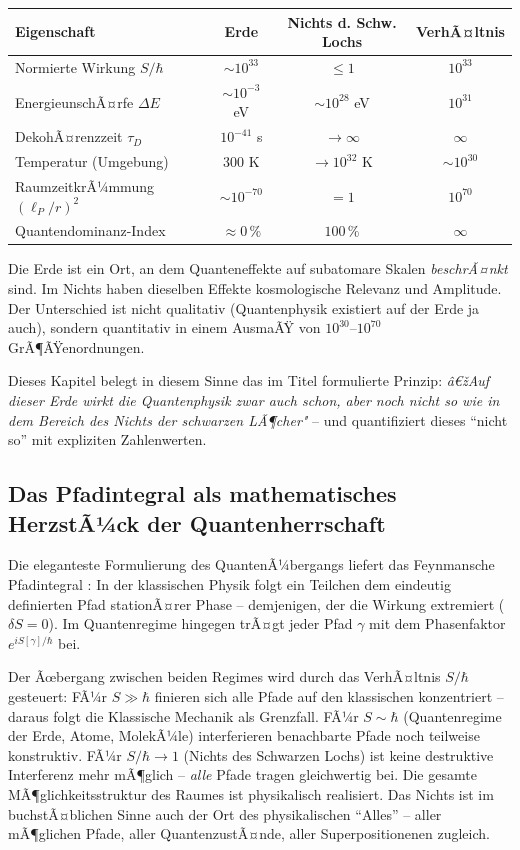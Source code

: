 ﻿\documentclass[12pt,a4paper]{report}
\begin{document}
\begin{center}
\renewcommand{\arraystretch}{1.35}
\begin{tabular}{lccc}
    \hline
    \textbf{Eigenschaft} & \textbf{Erde} & \textbf{Nichts d. Schw. Lochs} & \textbf{VerhÃ¤ltnis} \\
    \hline
    Normierte Wirkung $S/\hbar$ & $\sim 10^{33}$ & $\leq 1$ & $10^{33}$ \\
    EnergieunschÃ¤rfe $\Delta E$ & $\sim 10^{-3}$ eV & $\sim 10^{28}$ eV & $10^{31}$ \\
    DekohÃ¤renzzeit $\tau_D$ & $10^{-41}$ s & $\to \infty$ & $\infty$ \\
    Temperatur (Umgebung) & 300 K & $\to 10^{32}$ K & $\sim 10^{30}$ \\
    RaumzeitkrÃ¼mmung $(\ell_P/r)^2$ & $\sim 10^{-70}$ & $= 1$ & $10^{70}$ \\
    Quantendominanz-Index & $\approx 0\,\%$ & $100\,\%$ & $\infty$ \\
    \hline
\end{tabular}
\renewcommand{\arraystretch}{1.0}
\end{center}

Die Erde ist ein Ort, an dem Quanteneffekte auf subatomare Skalen \emph{beschrÃ¤nkt} sind. Im Nichts haben dieselben Effekte kosmologische Relevanz und Amplitude. Der Unterschied ist nicht qualitativ (Quantenphysik existiert auf der Erde ja auch), sondern quantitativ in einem AusmaÃŸ von $10^{30}$--$10^{70}$ GrÃ¶ÃŸenordnungen.

Dieses Kapitel belegt in diesem Sinne das im Titel formulierte Prinzip: \textit{â€žAuf dieser Erde wirkt die Quantenphysik zwar auch schon, aber noch nicht so wie in dem Bereich des Nichts der schwarzen LÃ¶cher"} -- und quantifiziert dieses "`nicht so"' mit expliziten Zahlenwerten.

\subsection{Das Pfadintegral als mathematisches HerzstÃ¼ck der Quantenherrschaft}

Die eleganteste Formulierung des QuantenÃ¼bergangs liefert das Feynmansche Pfadintegral \cite{feynman1965}: In der klassischen Physik folgt ein Teilchen dem eindeutig definierten Pfad stationÃ¤rer Phase -- demjenigen, der die Wirkung extremiert ($\delta S = 0$). Im Quantenregime hingegen trÃ¤gt jeder Pfad $\gamma$ mit dem Phasenfaktor $e^{iS[\gamma]/\hbar}$ bei.

Der Ãœbergang zwischen beiden Regimes wird durch das VerhÃ¤ltnis $S/\hbar$ gesteuert: FÃ¼r $S \gg \hbar$ finieren sich alle Pfade auf den klassischen konzentriert -- daraus folgt die Klassische Mechanik als Grenzfall. FÃ¼r $S \sim \hbar$ (Quantenregime der Erde, Atome, MolekÃ¼le) interferieren benachbarte Pfade noch teilweise konstruktiv. FÃ¼r $S/\hbar \to 1$ (Nichts des Schwarzen Lochs) ist keine destruktive Interferenz mehr mÃ¶glich -- \emph{alle} Pfade tragen gleichwertig bei. Die gesamte MÃ¶glichkeitsstruktur des Raumes ist physikalisch realisiert. Das Nichts ist im buchstÃ¤blichen Sinne auch der Ort des physikalischen "`Alles"' -- aller mÃ¶glichen Pfade, aller QuantenzustÃ¤nde, aller Superpositionenen zugleich.
\end{document}
